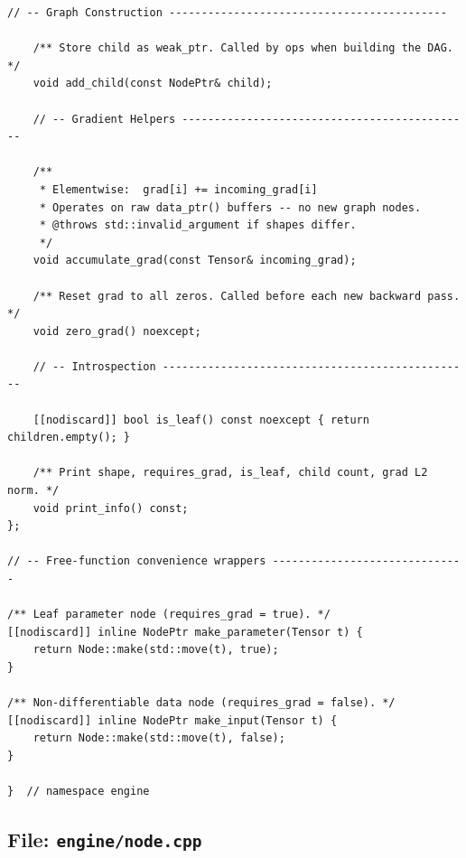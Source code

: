 \documentclass[12pt, a4paper]{article}
\begin{document}
\begin{lstlisting}[caption={\texttt{engine/node.hpp} - complete header}]
    // -- Graph Construction -------------------------------------------

    /** Store child as weak_ptr. Called by ops when building the DAG. */
    void add_child(const NodePtr& child);

    // -- Gradient Helpers ---------------------------------------------

    /**
     * Elementwise:  grad[i] += incoming_grad[i]
     * Operates on raw data_ptr() buffers -- no new graph nodes.
     * @throws std::invalid_argument if shapes differ.
     */
    void accumulate_grad(const Tensor& incoming_grad);

    /** Reset grad to all zeros. Called before each new backward pass. */
    void zero_grad() noexcept;

    // -- Introspection ------------------------------------------------

    [[nodiscard]] bool is_leaf() const noexcept { return children.empty(); }

    /** Print shape, requires_grad, is_leaf, child count, grad L2 norm. */
    void print_info() const;
};

// -- Free-function convenience wrappers ------------------------------

/** Leaf parameter node (requires_grad = true). */
[[nodiscard]] inline NodePtr make_parameter(Tensor t) {
    return Node::make(std::move(t), true);
}

/** Non-differentiable data node (requires_grad = false). */
[[nodiscard]] inline NodePtr make_input(Tensor t) {
    return Node::make(std::move(t), false);
}

}  // namespace engine
\end{lstlisting}

\newpage
\subsection{File: \texttt{engine/node.cpp}}
\end{document}
